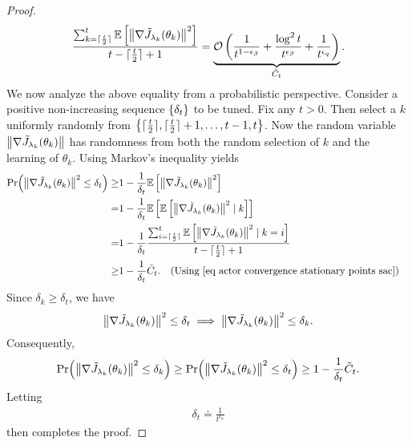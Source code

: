 \documentclass[twoside,11pt]{article}
\DeclarePairedDelimiter{\ceil}{\lceil}{\rceil}
\newcommand{\fO}{\mathcal{O}}
\newcommand{\E}{\mathbb{E}}
\numberwithin{assucounter}{section}
\begin{document}
\begin{proof}
\begin{align}
  \frac{\sum_{k=\ceil{\frac{t}{2}}}^t \E\left[\norm{ \nabla \tilde J_{\lambda_k}(\theta_k)}^2\right] }{t-\ceil{\frac{t}{2}}+1} = \underbrace{\fO\left(\frac{1}{t^{1-\epsilon_\beta}} + \frac{\log^2t}{t^{\epsilon_\beta}} + \frac{1}{t^{\epsilon_q}}\right)}_{\tilde C_t}.
\end{align}
We now analyze the above equality from a probabilistic perspective.
Consider a positive non-increasing sequence $\qty{\delta_t}$ to be tuned.
Fix any $t > 0$.
Then select a $k$ uniformly randomly from $\qty{\ceil{\frac{t}{2}}, \ceil{\frac{t}{2}} + 1, \dots, t-1, t}$.
Now the random variable $\norm{\nabla \tilde J_{\lambda_k}(\theta_k)}$ has randomness from both the random selection of $k$ and the learning of $\theta_k$.
Using Markov's inequality
yields
\begin{align}
  \Pr(\norm{\nabla \tilde J_{\lambda_k}(\theta_k)}^2 \leq \delta_t)
  \geq& 1 - \frac{1}{\delta_t} \E\left[\norm{\nabla \tilde J_{\lambda_k}(\theta_k)}^2\right] \\
  =& 1 - \frac{1}{\delta_t} \E\left[ \E\left[\norm{\nabla \tilde J_{\lambda_k}(\theta_k)}^2 \mid k \right] \right]\\
  =& 1 - \frac{1}{\delta_t} \frac{\sum_{i=\ceil{\frac{t}{2}}}^t \E\left[\norm{ \nabla \tilde J_{\lambda_k}(\theta_k)}^2 \mid k=i \right] }{t-\ceil{\frac{t}{2}}+1} \\
  \geq & 1 - \frac{1}{\delta_t} \tilde C_t. \qq{(Using \eqref{eq actor convergence stationary points sac})}
\end{align}
Since $\delta_k \geq \delta_t$,
we have
\begin{align}
  \norm{\nabla \tilde J_{\lambda_k}(\theta_k)}^2 \leq \delta_t \implies \norm{\nabla \tilde J_{\lambda_k}(\theta_k)}^2 \leq \delta_k.
\end{align}
Consequently,
\begin{align}
  \Pr(\norm{\nabla \tilde J_{\lambda_k}(\theta_k)}^2 \leq \delta_k) \geq \Pr(\norm{\nabla \tilde J_{\lambda_k}(\theta_k)}^2 \leq \delta_t) \geq 1 - \frac{1}{\delta_t} \tilde C_t.
\end{align}
Letting  
\begin{align}
  \delta_t \doteq \frac{1}{t^{\epsilon_0}}
\end{align}
then completes the proof.
\end{proof}
\end{document}
